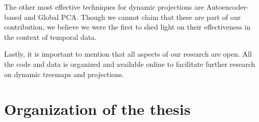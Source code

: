 The other most effective techniques for dynamic projections are Autoencoder-based and Global PCA. Though we cannot claim that these are part of our contribution, we believe we were the first to shed light on their effectiveness in the context of temporal data.  

\bigbreak

Lastly, it is important to mention that all aspects of our research are open. All the code and data is organized and available online to facilitate further research on dynamic treemaps and projections. 

\section{Organization of the thesis}





